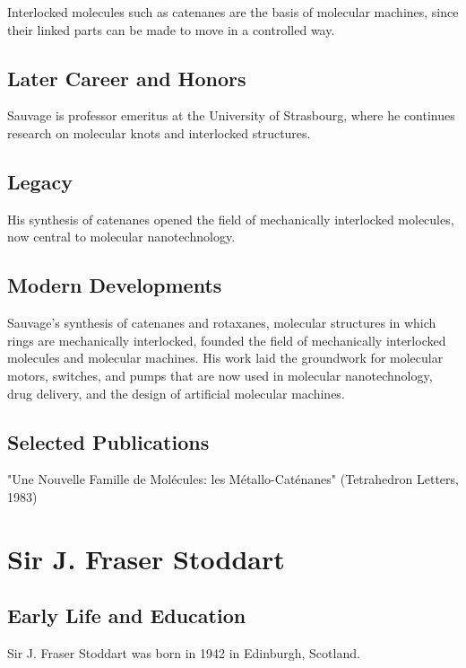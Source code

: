 Interlocked molecules such as catenanes are the basis of molecular machines, since their linked parts can be made to move in a controlled way.

\subsection*{Later Career and Honors}

Sauvage is professor emeritus at the University of Strasbourg, where he continues research on molecular knots and interlocked structures.

\subsection*{Legacy}

His synthesis of catenanes opened the field of mechanically interlocked molecules, now central to molecular nanotechnology.

\subsection*{Modern Developments}

Sauvage's synthesis of catenanes and rotaxanes, molecular structures in which rings are mechanically interlocked, founded the field of mechanically interlocked molecules and molecular machines. His work laid the groundwork for molecular motors, switches, and pumps that are now used in molecular nanotechnology, drug delivery, and the design of artificial molecular machines.

\subsection*{Selected Publications}

"Une Nouvelle Famille de Molécules: les Métallo-Caténanes" (Tetrahedron Letters, 1983)

\clearpage

\section{Sir J. Fraser Stoddart}

\subsection*{Early Life and Education}

Sir J. Fraser Stoddart was born in 1942 in Edinburgh, Scotland.

